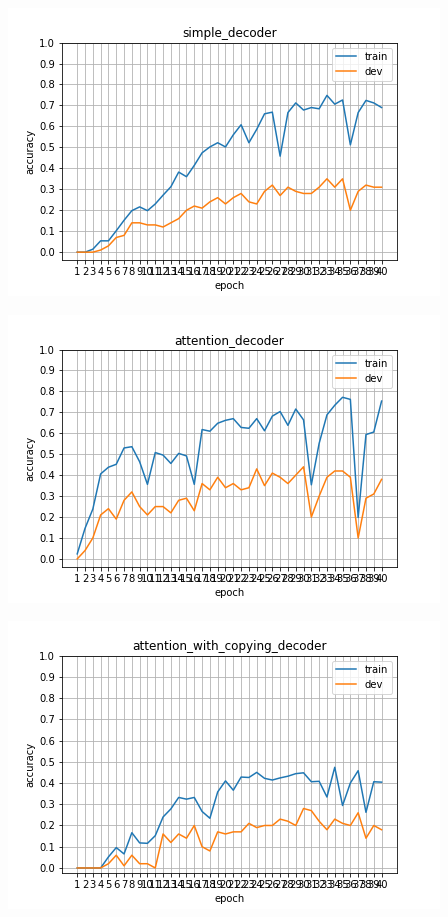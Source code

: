 \documentclass{article}
\begin{document}
\includegraphics[scale=0.5]{simple_decoder.png}

\includegraphics[scale=0.5]{attention_decoder.png}

\includegraphics[scale=0.5]{attention_with_copying_decoder.png}
\end{document}
